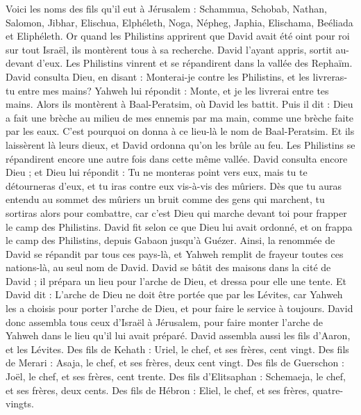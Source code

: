\begin{multicols}{2}
Voici les noms des fils qu'il eut à Jérusalem : Schammua, Schobab, Nathan, Salomon,
Jibhar, Elischua, Elphéleth,
Noga, Népheg, Japhia,
Elischama, Beéliada et Eliphéleth.
Or quand les Philistins apprirent que David avait été oint pour roi sur tout Israël, ils montèrent tous à sa recherche. David l'ayant appris, sortit au-devant d'eux.
Les Philistins vinrent et se répandirent dans la vallée des Rephaïm.
David consulta Dieu, en disant : Monterai-je contre les Philistins, et les livreras-tu entre mes mains? Yahweh lui répondit : Monte, et je les livrerai entre tes mains.
Alors ils montèrent à Baal-Peratsim, où David les battit. Puis il dit : Dieu a fait une brèche au milieu de mes ennemis par ma main, comme une brèche faite par les eaux. C'est pourquoi on donna à ce lieu-là le nom de Baal-Peratsim.
Et ils laissèrent là leurs dieux, et David ordonna qu'on les brûle au feu.
Les Philistins se répandirent encore une autre fois dans cette même vallée.
David consulta encore Dieu ; et Dieu lui répondit : Tu ne monteras point vers eux, mais tu te détourneras d'eux, et tu iras contre eux vis-à-vis des mûriers.
Dès que tu auras entendu au sommet des mûriers un bruit comme des gens qui marchent, tu sortiras alors pour combattre, car c'est Dieu qui marche devant toi pour frapper le camp des Philistins.
David fit selon ce que Dieu lui avait ordonné, et on frappa le camp des Philistins, depuis Gabaon jusqu'à Guézer.
Ainsi, la renommée de David se répandit par tous ces pays-là, et Yahweh remplit de frayeur toutes ces nations-là, au seul nom de David.
\VerseOne{}David se bâtit des maisons dans la cité de David ; il prépara un lieu pour l'arche de Dieu, et dressa pour elle une tente.
Et David dit : L'arche de Dieu ne doit être portée que par les Lévites, car Yahweh les a choisis pour porter l'arche de Dieu, et pour faire le service à toujours.
David donc assembla tous ceux d'Israël à Jérusalem, pour faire monter l'arche de Yahweh dans le lieu qu'il lui avait préparé.
David assembla aussi les fils d'Aaron, et les Lévites.
Des fils de Kehath : Uriel, le chef, et ses frères, cent vingt.
Des fils de Merari : Asaja, le chef, et ses frères, deux cent vingt.
Des fils de Guerschon : Joël, le chef, et ses frères, cent trente.
Des fils d'Elitsaphan : Schemaeja, le chef, et ses frères, deux cents.
Des fils de Hébron : Eliel, le chef, et ses frères, quatre-vingts.

\end{multicols}
